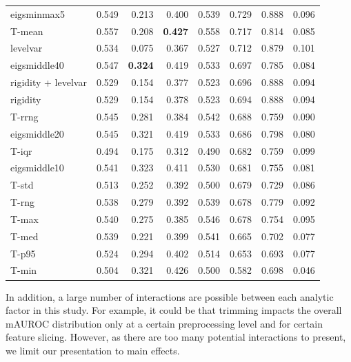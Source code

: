 \documentclass[12pt]{spieman}  %
\begin{document}
\begin{spacing}{2}
\begin{table}[h!]
\begin{tabular}{lrrrrrrr}
eigsminmax5                    &  0.549 &  0.213 &  0.400 &  0.539 &  0.729 &  0.888 &  0.096 \\
T-mean                         &  0.557 &  0.208 &  \textbf{0.427} &  0.558 &  0.717 &  0.814 &  0.085 \\
levelvar                       &  0.534 &  0.075 &  0.367 &  0.527 &  0.712 &  0.879 &  0.101 \\
eigsmiddle40                   &  0.547 &  \textbf{0.324} &  0.419 &  0.533 &  0.697 &  0.785 &  0.084 \\
rigidity + levelvar            &  0.529 &  0.154 &  0.377 &  0.523 &  0.696 &  0.888 &  0.094 \\
rigidity                       &  0.529 &  0.154 &  0.378 &  0.523 &  0.694 &  0.888 &  0.094 \\
T-rrng                         &  0.545 &  0.281 &  0.384 &  0.542 &  0.688 &  0.759 &  0.090 \\
eigsmiddle20                   &  0.545 &  0.321 &  0.419 &  0.533 &  0.686 &  0.798 &  0.080 \\
T-iqr                          &  0.494 &  0.175 &  0.312 &  0.490 &  0.682 &  0.759 &  0.099 \\
eigsmiddle10                   &  0.541 &  0.323 &  0.411 &  0.530 &  0.681 &  0.755 &  0.081 \\
T-std                          &  0.513 &  0.252 &  0.392 &  0.500 &  0.679 &  0.729 &  0.086 \\
T-rng                          &  0.538 &  0.279 &  0.392 &  0.539 &  0.678 &  0.779 &  0.092 \\
T-max                          &  0.540 &  0.275 &  0.385 &  0.546 &  0.678 &  0.754 &  0.095 \\
T-med                          &  0.539 &  0.221 &  0.399 &  0.541 &  0.665 &  0.702 &  0.077 \\
T-p95                          &  0.524 &  0.294 &  0.402 &  0.514 &  0.653 &  0.693 &  0.077 \\
T-min                          &  0.504 &  0.321 &  0.426 &  0.500 &  0.582 &  0.698 &  0.046 \\
\hline
\end{tabular}
\end{table}

In addition, a large number of interactions are possible between each analytic
factor in this study. For example, it could be that trimming impacts the
overall mAUROC distribution only at a certain preprocessing level and for
certain feature slicing. However, as there are too many potential interactions
to present, we limit our presentation to main effects.


\end{spacing}
\end{document}
